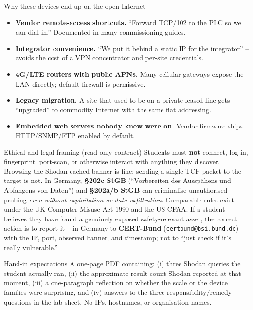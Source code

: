 \documentclass[11pt,a4paper]{article}
\begin{document}
\begin{solutionbox}{Why these devices end up on the open Internet}
\begin{itemize}\setlength{\itemsep}{1pt}
  \item \textbf{Vendor remote-access shortcuts.} ``Forward TCP/102 to the PLC so we can dial in.'' Documented in many commissioning guides.
  \item \textbf{Integrator convenience.} ``We put it behind a static IP for the integrator'' -- avoids the cost of a VPN concentrator and per-site credentials.
  \item \textbf{4G/LTE routers with public APNs.} Many cellular gateways expose the LAN directly; default firewall is permissive.
  \item \textbf{Legacy migration.} A site that used to be on a private leased line gets ``upgraded'' to commodity Internet with the same flat addressing.
  \item \textbf{Embedded web servers nobody knew were on.} Vendor firmware ships HTTP/SNMP/FTP enabled by default.
\end{itemize}
\end{solutionbox}

\begin{solutionbox}{Ethical and legal framing (read-only contract)}
Students must \textbf{not} connect, log in, fingerprint, port-scan, or otherwise interact with anything they discover. Browsing the Shodan-cached banner is fine; sending a single TCP packet to the target is not.
In Germany, \textbf{\S 202c StGB} (``Vorbereiten des Aussp\"ahens und Abfangens von Daten'') and \textbf{\S 202a/b StGB} can criminalise unauthorised probing \textit{even without exploitation or data exfiltration}. Comparable rules exist under the UK Computer Misuse Act 1990 and the US CFAA.
If a student believes they have found a genuinely exposed safety-relevant asset, the correct action is to report it -- in Germany to \textbf{CERT-Bund} (\texttt{certbund@bsi.bund.de}) with the IP, port, observed banner, and timestamp; not to ``just check if it's really vulnerable.''
\end{solutionbox}

\begin{solutionbox}{Hand-in expectations}
A one-page PDF containing: (i) three Shodan queries the student actually ran, (ii) the approximate result count Shodan reported at that moment, (iii) a one-paragraph reflection on whether the scale or the device families were surprising, and (iv) answers to the three responsibility/remedy questions in the lab sheet. No IPs, hostnames, or organisation names.
\end{solutionbox}
\end{document}
